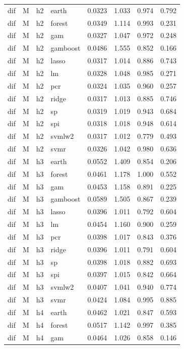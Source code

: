 \begin{ThreePartTable}
\begin{longtable}[t]{llclcccc}
dif & M & h2 & earth & 0.0323 & 1.033 & 0.974 & 0.792\\
dif & M & h2 & forest & 0.0349 & 1.114 & 0.993 & 0.231\\
dif & M & h2 & gam & 0.0327 & 1.047 & 0.972 & 0.248\\
dif & M & h2 & gamboost & 0.0486 & 1.555 & 0.852 & 0.166\\
dif & M & h2 & lasso & 0.0317 & 1.014 & 0.886 & 0.743\\
dif & M & h2 & lm & 0.0328 & 1.048 & 0.985 & 0.271\\
dif & M & h2 & pcr & 0.0324 & 1.035 & 0.960 & 0.257\\
dif & M & h2 & ridge & 0.0317 & 1.013 & 0.885 & 0.746\\
dif & M & h2 & sp & 0.0319 & 1.019 & 0.943 & 0.684\\
dif & M & h2 & spi & 0.0318 & 1.018 & 0.948 & 0.614\\
dif & M & h2 & svmlw2 & 0.0317 & 1.012 & 0.779 & 0.493\\
dif & M & h2 & svmr & 0.0326 & 1.042 & 0.980 & 0.636\\
\addlinespace
dif & M & h3 & earth & 0.0552 & 1.409 & 0.854 & 0.206\\
dif & M & h3 & forest & 0.0461 & 1.178 & 1.000 & 0.552\\
dif & M & h3 & gam & 0.0453 & 1.158 & 0.891 & 0.225\\
dif & M & h3 & gamboost & 0.0589 & 1.505 & 0.867 & 0.239\\
dif & M & h3 & lasso & 0.0396 & 1.011 & 0.792 & 0.604\\
dif & M & h3 & lm & 0.0454 & 1.160 & 0.900 & 0.259\\
dif & M & h3 & pcr & 0.0398 & 1.017 & 0.843 & 0.376\\
dif & M & h3 & ridge & 0.0396 & 1.011 & 0.791 & 0.604\\
dif & M & h3 & sp & 0.0398 & 1.018 & 0.882 & 0.693\\
dif & M & h3 & spi & 0.0397 & 1.015 & 0.842 & 0.664\\
dif & M & h3 & svmlw2 & 0.0407 & 1.041 & 0.940 & 0.774\\
dif & M & h3 & svmr & 0.0424 & 1.084 & 0.995 & 0.885\\
\addlinespace
dif & M & h4 & earth & 0.0462 & 1.021 & 0.847 & 0.593\\
dif & M & h4 & forest & 0.0517 & 1.142 & 0.997 & 0.385\\
dif & M & h4 & gam & 0.0464 & 1.026 & 0.858 & 0.146\\

\end{longtable}
\end{ThreePartTable}

